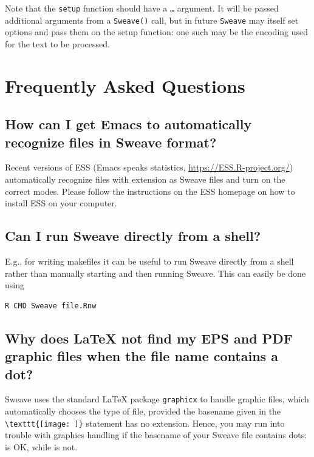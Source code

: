 \documentclass[a4paper]{article}
\begin{document}
Note that the \texttt{setup} function should have a \texttt{\ldots}
argument.  It will be passed additional arguments from a
\texttt{Sweave()} call, but in future \texttt{Sweave} may itself set
options and pass them on the setup function: one such may be the
encoding used for the text to be processed.




\newpage
\appendix


\section{Frequently Asked Questions}
\label{sec:faq}

  \subsection{How can I get Emacs to automatically recognize files
    in Sweave format?}

  Recent versions of ESS (Emacs speaks statistics,
  \url{https://ESS.R-project.org/}) automatically recognize files with
  extension  as Sweave files and turn on the correct
  modes. Please follow the instructions on the ESS homepage on how to
  install ESS on your computer.

  \subsection{Can I run Sweave directly from a shell?}

  E.g., for writing makefiles it can be useful to run Sweave directly
  from a shell rather than manually starting \R{} and then running
  Sweave. This can easily be done using
\begin{verbatim}
R CMD Sweave file.Rnw
\end{verbatim}


  \subsection{Why does \LaTeX{} not find my EPS and PDF graphic files when
     the file name contains a dot?}

   Sweave uses the standard \LaTeX{} package \texttt{graphicx} to
   handle graphic files, which automatically chooses the type of file,
   provided the basename given in the \verb|\texttt{[image: ]}|
   statement has no extension.  Hence, you may run into trouble with
   graphics handling if the basename of your Sweave file contains
   dots:  is OK, while  is not.
\end{document}
